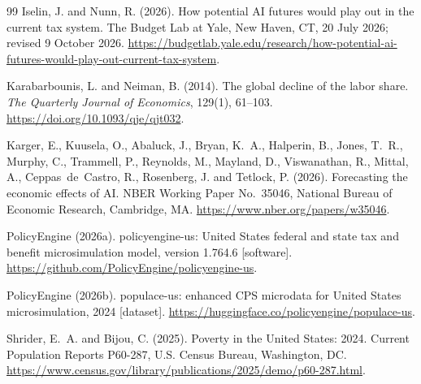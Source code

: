 \begin{thebibliography}{99}
Iselin, J. and Nunn, R. (2026).
\newblock How potential AI futures would play out in the current tax system.
\newblock The Budget Lab at Yale, New Haven, CT, 20 July 2026; revised
9 October 2026.
\newblock \url{https://budgetlab.yale.edu/research/how-potential-ai-futures-would-play-out-current-tax-system}.

Karabarbounis, L. and Neiman, B. (2014).
\newblock The global decline of the labor share.
\newblock \emph{The Quarterly Journal of Economics}, 129(1), 61--103.
\newblock \url{https://doi.org/10.1093/qje/qjt032}.

Karger, E., Kuusela, O., Abaluck, J., Bryan, K.~A., Halperin, B., Jones,
T.~R., Murphy, C., Trammell, P., Reynolds, M., Mayland, D., Viswanathan,
R., Mittal, A., Ceppas~de~Castro, R., Rosenberg, J. and Tetlock, P. (2026).
\newblock Forecasting the economic effects of AI.
\newblock NBER Working Paper No.~35046, National Bureau of Economic
Research, Cambridge, MA.
\newblock \url{https://www.nber.org/papers/w35046}.

PolicyEngine (2026a).
\newblock policyengine-us: United States federal and state tax and benefit
microsimulation model, version 1.764.6 [software].
\newblock \url{https://github.com/PolicyEngine/policyengine-us}.

PolicyEngine (2026b).
\newblock populace-us: enhanced CPS microdata for United States
microsimulation, 2024 [dataset].
\newblock \url{https://huggingface.co/policyengine/populace-us}.

Shrider, E.~A. and Bijou, C. (2025).
\newblock Poverty in the United States: 2024.
\newblock Current Population Reports P60-287, U.S. Census Bureau,
Washington, DC.
\newblock \url{https://www.census.gov/library/publications/2025/demo/p60-287.html}.

\end{thebibliography}
